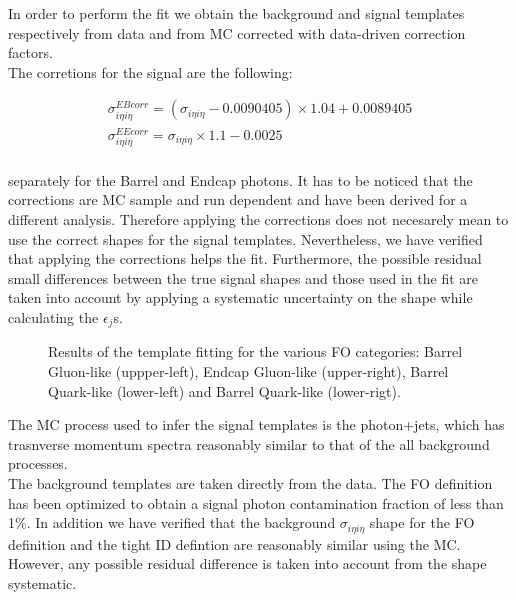 In order to perform the fit we obtain the background and signal templates respectively from data and from MC corrected with data-driven correction factors. \\

The corretions for the signal are the following:

\begin{eqnarray}
\sigma_{i \eta i \eta}^{EB corr} = (\sigma_{i \eta i \eta} - 0.0090405) \times 1.04 + 0.0089405 \nonumber \\
\sigma_{i \eta i \eta}^{EE corr} = \sigma_{i \eta i \eta} \times 1.1 - 0.0025 \nonumber \\
\end{eqnarray}

separately for the Barrel and Endcap photons. It has to be noticed that the corrections are MC sample and run dependent and have been derived for a different analysis. Therefore applying the corrections does not necesarely mean to 
use the
 correct shapes for the signal templates. Nevertheless, we have verified that applying the corrections helps the fit. Furthermore, the possible residual small differences between the true signal shapes and those used in the fit 
are taken 
into account by applying a systematic uncertainty on the shape while calculating the $\epsilon_{j}$s. \\ 

\begin{figure}[!ht]
  \begin{center}
  \end{center}
    \caption{Results of the template fitting for the various FO categories: Barrel Gluon-like (uppper-left), Endcap Gluon-like (upper-right), Barrel Quark-like (lower-left) and Barrel Quark-like (lower-rigt).}
    \label{Templates}
\end{figure}


The MC process used to infer the signal templates is the photon+jets, which has trasnverse momentum spectra reasonably similar to that of the all background processes. \\

The background templates are taken directly from the data. The FO definition has been optimized to obtain a signal photon contamination fraction of less than 1$\%$. In addition we have verified that the background $\sigma_{i \eta 
i \eta}$
 shape for the FO definition and the tight ID defintion are reasonably similar using the MC. However, any possible residual difference is taken into account from the shape systematic. \\


